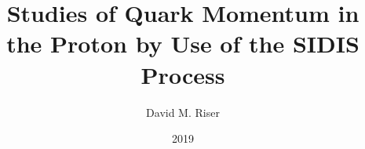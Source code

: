 \abstract{
        
}

\title{Studies of Quark Momentum in the Proton by Use of the SIDIS Process}
\author{David M. Riser}
\date{2019}




\dedication{
        \textit{Dedicated to my grandfather, Abdul Qaissaunee}
}

\acknowledgements{
        
}
